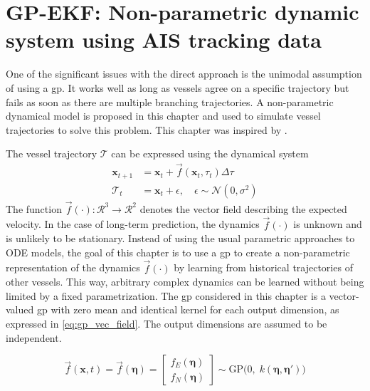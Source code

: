 \chapter{GP-EKF: Non-parametric dynamic system using AIS tracking data}\label{chap:gp_ekf}
One of the significant issues with the direct approach is the unimodal assumption of using a \acrshort{gp}. It works well as long as vessels agree on a specific trajectory but fails as soon as there are multiple branching trajectories. A non-parametric dynamical model is proposed in this chapter and used to simulate vessel trajectories to solve this problem. This chapter was inspired by \cite{pedestrian,gpekf,vehicle_gp_prediction}.



The vessel trajectory $\boldsymbol{\mathcal{T}}$ can be expressed using the dynamical system
\begin{subequations}
    \begin{align}
        \boldsymbol{x}_{t+1}       & = \boldsymbol{x}_t + \vec{f}(\boldsymbol{x}_t,\tau_t)\Delta \tau            \\
        \boldsymbol{\mathcal{T}}_t & = \boldsymbol{x}_t + \epsilon, \quad \epsilon \sim \mathcal{N}(0, \sigma^2)
    \end{align}
\end{subequations}
The function $\vec{f}(\cdot): \mathcal{R}^3 \to \mathcal{R}^2$ denotes the vector field describing the expected velocity. In the case of long-term prediction, the dynamics $\vec{f}(\cdot)$ is unknown and is unlikely to be stationary. Instead of using the usual parametric approaches to ODE models, the goal of this chapter is to use a \acrshort{gp} to create a non-parametric representation of the dynamics $\vec{f}(\cdot)$ by learning from historical trajectories of other vessels. This way, arbitrary complex dynamics can be learned without being limited by a fixed parametrization. The \acrshort{gp} considered in this chapter is a vector-valued \acrshort{gp} with zero mean and identical kernel for each output dimension, as expressed in \cref{eq:gp_vec_field}. The output dimensions are assumed to be independent.

\begin{equation}\label{eq:gp_vec_field}
    \vec{f}(\boldsymbol{x}, t) = \vec{f}(\boldsymbol{\eta}) = \begin{bmatrix} f_E (\boldsymbol{\eta})\\ f_N (\boldsymbol{\eta})\end{bmatrix} \sim \text{GP} \big(0 , \; k(\boldsymbol{\eta}, \boldsymbol{\eta}')\big)
\end{equation}

